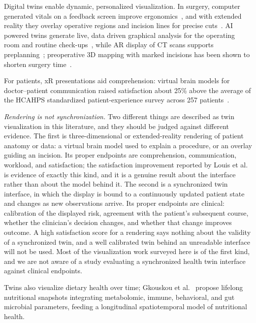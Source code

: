 \documentclass[journal]{IEEEtran}
\begin{document}
Digital twins enable dynamic, personalized visualization. In surgery, computer generated vitals on a feedback screen improve ergonomics~\cite{Auvinet2018AR}, and with extended reality they overlay operative regions and incision lines for precise cuts~\cite{QUESADAOLARTE20221580}. AI powered twins generate live, data driven graphical analysis for the operating room and routine check-ups~\cite{Vallee2023DT}, while AR display of CT scans supports preplanning~\cite{Southworth2020XR}; preoperative 3D mapping with marked incisions has been shown to shorten surgery time~\cite{Auvinet2018AR}.

For patients, xR presentations aid comprehension: virtual brain models for doctor--patient communication raised satisfaction about 25\% above the average of the HCAHPS standardized patient-experience survey across 257 patients~\cite{Louis2021VR}.

\emph{Rendering is not synchronization.} Two different things are described as twin visualization in this literature, and they should be judged against different evidence. The first is three-dimensional or extended-reality rendering of patient anatomy or data: a virtual brain model used to explain a procedure, or an overlay guiding an incision. Its proper endpoints are comprehension, communication, workload, and satisfaction; the satisfaction improvement reported by Louis et al.~\cite{Louis2021VR} is evidence of exactly this kind, and it is a genuine result about the interface rather than about the model behind it. The second is a synchronized twin interface, in which the display is bound to a continuously updated patient state and changes as new observations arrive. Its proper endpoints are clinical: calibration of the displayed risk, agreement with the patient's subsequent course, whether the clinician's decision changes, and whether that change improves outcome. A high satisfaction score for a rendering says nothing about the validity of a synchronized twin, and a well calibrated twin behind an unreadable interface will not be used. Most of the visualization work surveyed here is of the first kind, and we are not aware of a study evaluating a synchronized health twin interface against clinical endpoints.

Twins also visualize dietary health over time; Gkouskou et al.~\cite{gkouskou2020virtual} propose lifelong nutritional snapshots integrating metabolomic, immune, behavioral, and gut microbial parameters, feeding a longitudinal spatiotemporal model of nutritional health.
\end{document}
